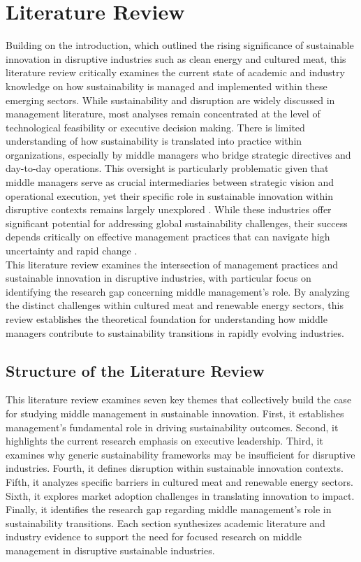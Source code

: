 	\section{Literature Review}
	\label{sec:litreview}
	
	Building on the introduction, which outlined the rising significance of sustainable innovation in disruptive industries such as clean energy and cultured meat, this literature review critically examines the current state of academic and industry knowledge on how sustainability is managed and implemented within these emerging sectors. While sustainability and disruption are widely discussed in management literature, most analyses remain concentrated at the level of technological feasibility or executive decision making. There is limited understanding of how sustainability is translated into practice within organizations, especially by middle managers who bridge strategic directives and day-to-day operations. This oversight is particularly problematic given that middle managers serve as crucial intermediaries between strategic vision and operational execution, yet their specific role in sustainable innovation within disruptive contexts remains largely unexplored \cite{Floyd1997}. While these industries offer significant potential for addressing global sustainability challenges, their success depends critically on effective management practices that can navigate high uncertainty and rapid change \cite{Christensen1997}. \\
	
	This literature review examines the intersection of management practices and sustainable innovation in disruptive industries, with particular focus on identifying the research gap concerning middle management’s role. By analyzing the distinct challenges within cultured meat and renewable energy sectors, this review establishes the theoretical foundation for understanding how middle managers contribute to sustainability transitions in rapidly evolving industries. \\
	
	\subsection*{Structure of the Literature Review}
	This literature review examines seven key themes that collectively build the case for studying middle management in sustainable innovation. First, it establishes management’s fundamental role in driving sustainability outcomes. Second, it highlights the current research emphasis on executive leadership. Third, it examines why generic sustainability frameworks may be insufficient for disruptive industries. Fourth, it defines disruption within sustainable innovation contexts. Fifth, it analyzes specific barriers in cultured meat and renewable energy sectors. Sixth, it explores market adoption challenges in translating innovation to impact. Finally, it identifies the research gap regarding middle management’s role in sustainability transitions. Each section synthesizes academic literature and industry evidence to support the need for focused research on middle management in disruptive sustainable industries. \\
	
